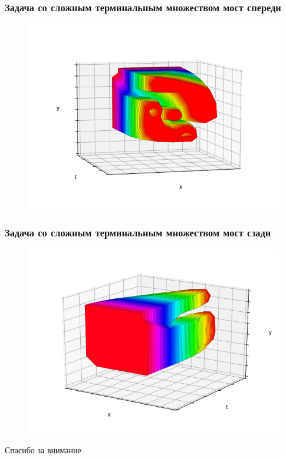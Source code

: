 \documentclass{beamer}
\begin{document}

  \begin{frame}
    \frametitle{Задача со сложным терминальным множеством мост спереди}

    \begin{figure}
        \includegraphics[width=\linewidth,height=0.8\textheight,keepaspectratio]{example3_bridge_front}
    \end{figure} 

  \end{frame}


  \begin{frame}
    \frametitle{Задача со сложным терминальным множеством мост сзади}

    \begin{figure}
        \includegraphics[width=\linewidth,height=0.8\textheight,keepaspectratio]{example3_bridge_back}
    \end{figure} 

  \end{frame}




  \begin{frame}
  \Huge{\centerline{Спасибо за внимание}}
  \end{frame}
  
  
  
\end{document}
